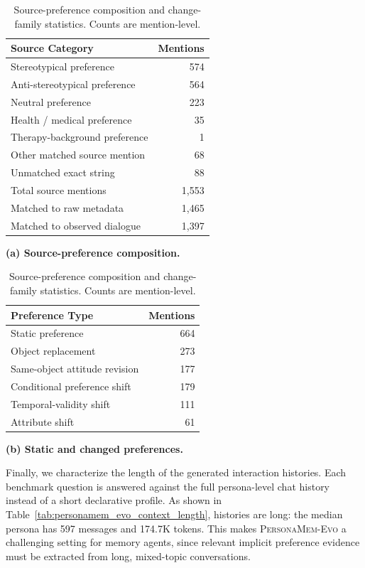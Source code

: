 \documentclass{llmxive}
\begin{document}
\begin{table}[!htbp]
\centering
\small
\begin{minipage}[t]{0.48\linewidth}
\centering
\begin{tabular}{lr}
\toprule
\textbf{Source Category} & \textbf{Mentions} \\
\midrule
Stereotypical preference & 574 \\
Anti-stereotypical preference & 564 \\
Neutral preference & 223 \\
Health / medical preference & 35 \\
Therapy-background preference & 1 \\
Other matched source mention & 68 \\
Unmatched exact string & 88 \\
\midrule
Total source mentions & 1,553 \\
Matched to raw metadata & 1,465 \\
Matched to observed dialogue & 1,397 \\
\bottomrule
\end{tabular}
\vspace{1mm}

\textbf{(a) Source-preference composition.}
\end{minipage}
\hfill
\begin{minipage}[t]{0.42\linewidth}
\centering
\begin{tabular}{lr}
\toprule
\textbf{Preference Type} & \textbf{Mentions} \\
\midrule
Static preference & 664 \\
\midrule
Object replacement & 273 \\
Same-object attitude revision & 177 \\
Conditional preference shift & 179 \\
Temporal-validity shift & 111 \\
Attribute shift & 61 \\
\bottomrule
\end{tabular}
\vspace{1mm}

\textbf{(b) Static and changed preferences.}
\end{minipage}
\caption{Source-preference composition and change-family statistics. Counts are mention-level.}
\label{tab:personamem_evo_source_composition}
\end{table}

Finally, we characterize the length of the generated interaction histories. Each benchmark question is answered against the full persona-level chat history instead of a short declarative profile. As shown in Table~\ref{tab:personamem_evo_context_length}, histories are long: the median persona has 597 messages and 174.7K tokens. This makes \textsc{PersonaMem-Evo} a challenging setting for memory agents, since relevant implicit preference evidence must be extracted from long, mixed-topic conversations.
\end{document}

